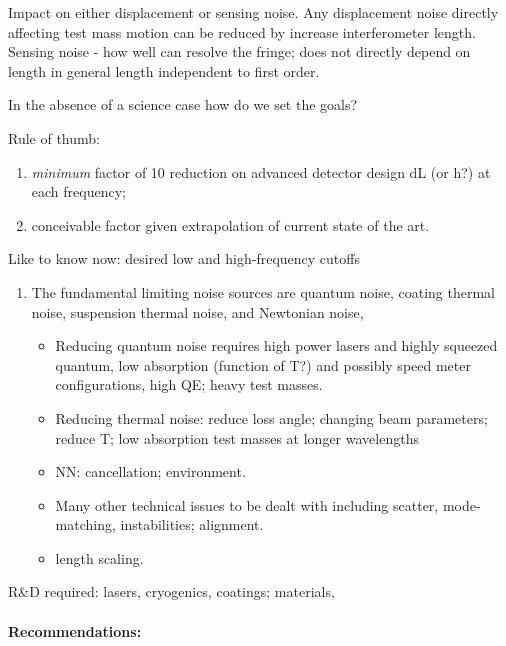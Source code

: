 Impact on either displacement or sensing noise.  Any displacement noise directly affecting test mass motion can be reduced by increase interferometer length. Sensing noise  - how well can resolve the fringe; does not directly depend on length in general length independent to first order.

In the absence of a science case how do we set the goals?

Rule of thumb:  

\begin{enumerate}
\item  \textit{ minimum} factor of 10 reduction on advanced detector design dL (or h?) at each frequency;  

\item  conceivable factor given extrapolation of current state of the art.
\end{enumerate}

Like to know now:  desired low and high-frequency cutoffs

\begin{enumerate}
\item  The fundamental limiting noise sources are quantum noise, coating thermal noise, suspension thermal noise, and Newtonian noise,
\begin{itemize}
\item Reducing quantum noise requires high power lasers and highly squeezed quantum, low absorption (function of T?) and possibly speed meter configurations, high QE; heavy test masses.
\item  Reducing thermal noise:  reduce loss angle; changing beam parameters; reduce T;  low absorption test masses at longer wavelengths
\item NN:  cancellation; environment.
\item  Many other technical issues to be dealt with including scatter, mode-matching, instabilities; alignment.
\item length scaling.
\end{itemize}
\end{enumerate}

 R\&D required:  lasers, cryogenics, coatings; materials, \\
 
\paragraph{Recommendations:}

